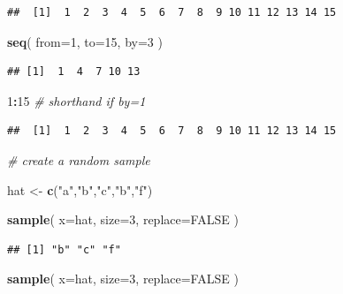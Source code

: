 \documentclass[]{book}
\newenvironment{Shaded}{\begin{snugshade}}{\end{snugshade}}
\newcommand{\CommentTok}[1]{\textcolor[rgb]{0.56,0.35,0.01}{\textit{#1}}}
\newcommand{\DataTypeTok}[1]{\textcolor[rgb]{0.13,0.29,0.53}{#1}}
\newcommand{\DecValTok}[1]{\textcolor[rgb]{0.00,0.00,0.81}{#1}}
\newcommand{\KeywordTok}[1]{\textcolor[rgb]{0.13,0.29,0.53}{\textbf{#1}}}
\newcommand{\NormalTok}[1]{#1}
\newcommand{\OperatorTok}[1]{\textcolor[rgb]{0.81,0.36,0.00}{\textbf{#1}}}
\newcommand{\OtherTok}[1]{\textcolor[rgb]{0.56,0.35,0.01}{#1}}
\newcommand{\StringTok}[1]{\textcolor[rgb]{0.31,0.60,0.02}{#1}}
\theoremstyle{definition}
\theoremstyle{definition}
\theoremstyle{definition}
\theoremstyle{remark}
\begin{document}
\begin{verbatim}
##  [1]  1  2  3  4  5  6  7  8  9 10 11 12 13 14 15
\end{verbatim}

\begin{Shaded}
\begin{Highlighting}[]
\KeywordTok{seq}\NormalTok{( }\DataTypeTok{from=}\DecValTok{1}\NormalTok{, }\DataTypeTok{to=}\DecValTok{15}\NormalTok{, }\DataTypeTok{by=}\DecValTok{3}\NormalTok{ )}
\end{Highlighting}
\end{Shaded}

\begin{verbatim}
## [1]  1  4  7 10 13
\end{verbatim}

\begin{Shaded}
\begin{Highlighting}[]
\DecValTok{1}\OperatorTok{:}\DecValTok{15}   \CommentTok{# shorthand if by=1}
\end{Highlighting}
\end{Shaded}

\begin{verbatim}
##  [1]  1  2  3  4  5  6  7  8  9 10 11 12 13 14 15
\end{verbatim}

\begin{Shaded}
\begin{Highlighting}[]
\CommentTok{# create a random sample}

\NormalTok{hat <-}\StringTok{ }\KeywordTok{c}\NormalTok{(}\StringTok{"a"}\NormalTok{,}\StringTok{"b"}\NormalTok{,}\StringTok{"c"}\NormalTok{,}\StringTok{"b"}\NormalTok{,}\StringTok{"f"}\NormalTok{)}

\KeywordTok{sample}\NormalTok{( }\DataTypeTok{x=}\NormalTok{hat, }\DataTypeTok{size=}\DecValTok{3}\NormalTok{, }\DataTypeTok{replace=}\OtherTok{FALSE}\NormalTok{ )}
\end{Highlighting}
\end{Shaded}

\begin{verbatim}
## [1] "b" "c" "f"
\end{verbatim}

\begin{Shaded}
\begin{Highlighting}[]
\KeywordTok{sample}\NormalTok{( }\DataTypeTok{x=}\NormalTok{hat, }\DataTypeTok{size=}\DecValTok{3}\NormalTok{, }\DataTypeTok{replace=}\OtherTok{FALSE}\NormalTok{ )}
\end{Highlighting}
\end{Shaded}
\end{document}

